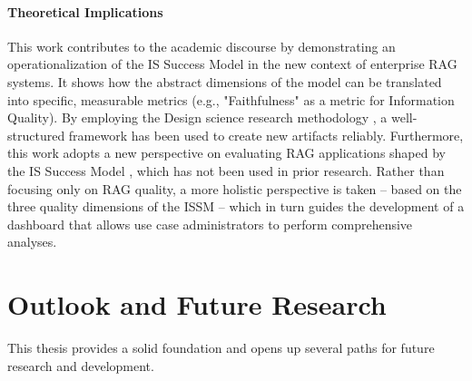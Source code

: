 \documentclass[
	english,
	ruledheaders=section,%
	class=report,%
	thesis={type=bachelor},%
	accentcolor=1b,%
	custommargins=true,%
	marginpar=false,%
	parskip=half-,%
	fontsize=11pt,%
	DIV=14,
]{tudapub}
\begin{document}
\paragraph{Theoretical Implications} This work contributes to the academic discourse by demonstrating an operationalization of the IS Success Model \parencite{DeloneMcLean2003ISSuccessTenYearUpdate} in the new context of enterprise RAG systems. It shows how the abstract dimensions of the model can be translated into specific, measurable metrics (e.g., "Faithfulness" as a metric for Information Quality). By employing the Design science research methodology \parencite{Peffers2007}, a well-structured framework has been used to create new artifacts reliably. Furthermore, this work adopts a new perspective on evaluating RAG applications shaped by the IS Success Model \parencite{DeloneMcLean2003ISSuccessTenYearUpdate}, which has not been used in prior research. Rather than focusing only on RAG quality, a more holistic perspective is taken -- based on the three quality dimensions of the ISSM \parencite{DeloneMcLean2003ISSuccessTenYearUpdate} -- which in turn guides the development of a dashboard that allows use case administrators to perform comprehensive analyses.

\section{Outlook and Future Research}
This thesis provides a solid foundation and opens up several paths for future research and development.
\end{document}
